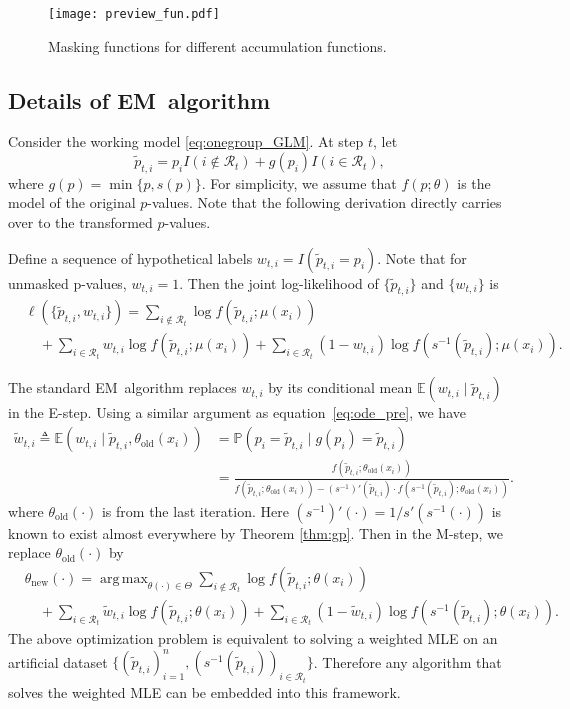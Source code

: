 \documentclass{biometrika}
\newcommand{\cR}{\mathcal{R}}
\newcommand{\EM}{EM}
\newcommand{\td}{\tilde}
\newcommand{\E}{\mathbb{E}}
\renewcommand{\P}{\mathbb{P}}
\newcommand{\1}{\mathbf{1}}
\DeclareMathOperator*{\argmax}{arg\,max}
\begin{document}
\begin{figure}[h]
  \centering
  \texttt{[image: preview\_fun.pdf]}
  \caption{Masking functions for different accumulation functions.}\label{fig:masking_fun}
\end{figure}

\subsection{Details of \EM ~algorithm}\label{subapp:EM}
Consider the working model \eqref{eq:onegroup_GLM}. At step $t$, let 
\[\td{p}_{t, i} = p_{i}I(i\not\in \cR_{t}) + g(p_{i})I(i\in \cR_{t}),\]
where $g(p) = \min\{p, s(p)\}$. For simplicity, we assume that $f(p; \theta)$ is the model of the original $p$-values. Note that the following derivation directly carries over to the transformed $p$-values.

Define a sequence of hypothetical labels $w_{t, i} = I(\td{p}_{t, i} = p_{i})$. Note that for unmasked p-values, $w_{t, i} = 1$. Then the joint log-likelihood of $\{\td{p}_{t, i}\}$ and $\{w_{t, i}\}$ is 
\begin{align}
&\ell(\{\td{p}_{t, i}, w_{t, i}\}) = \sum_{i\not\in \cR_{t}}\log f(\td{p}_{t, i}; \mu(x_{i}))\nonumber\\ 
& \quad + \sum_{i\in \cR_{t}}w_{t, i}\log f(\td{p}_{t, i}; \mu(x_{i})) + \sum_{i\in \cR_{t}} (1 - w_{t, i}) \log f(s^{-1}(\td{p}_{t, i}); \mu(x_{i})).\nonumber
\end{align}

The standard \EM ~algorithm replaces $w_{t, i}$ by its conditional mean $\E (w_{t, i} \mid \td{p}_{t, i})$ in the E-step. Using a similar argument as equation~\eqref{eq:ode_pre}, we have
\begin{align}
\td{w}_{t, i}\triangleq \E (w_{t, i} \mid \td{p}_{t, i}, \theta_{\mathrm{old}}(x_{i}))& = \P (p_{i} = \td{p}_{t, i} \mid g(p_{i}) = \td{p}_{t, i})\nonumber\\ 
& = \frac{f(\td{p}_{t, i}; \theta_{\mathrm{old}}(x_{i}))}{f(\td{p}_{t, i}; \theta_{\mathrm{old}}(x_{i})) - (s^{-1})'(\td{p}_{t, i})\cdot f(s^{-1}(\td{p}_{t, i}); \theta_{\mathrm{old}}(x_{i}))}.\label{eq:Estep}
\end{align}
where $\theta_{\mathrm{old}}(\cdot)$ is from the last iteration. Here $(s^{-1})'(\cdot) = 1 / s'(s^{-1}(\cdot))$ is known to exist almost everywhere by Theorem \ref{thm:gp}. Then in the M-step, we replace $\theta_{\mathrm{old}}(\cdot)$ by 
\begin{align}
& \theta_{\mathrm{new}}(\cdot) = \argmax_{\theta(\cdot)\in \Theta}  \sum_{i\not\in \cR_{t}}\log f(\td{p}_{t, i}; \theta(x_{i}))\nonumber\\ 
& \quad + \sum_{i\in \cR_{t}}\td{w}_{t, i}\log f(\td{p}_{t, i}; \theta(x_{i})) + \sum_{i\in \cR_{t}} (1 - \td{w}_{t, i}) \log f(s^{-1}(\td{p}_{t, i}); \theta(x_{i})).\label{eq:Mstep}
\end{align}
The above optimization problem is equivalent to solving a weighted MLE on an artificial dataset $\{(\td{p}_{t, i})_{i=1}^{n}, (s^{-1}(\td{p}_{t, i}))_{i\in \cR_{t}}\}$. Therefore any algorithm that solves the weighted MLE can be embedded into this framework. 
\end{document}
